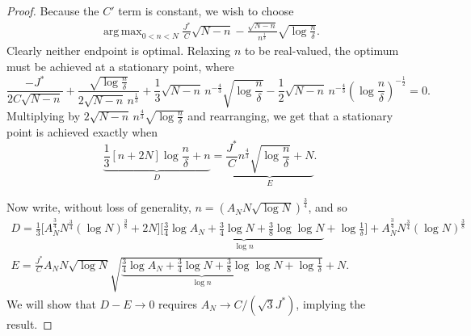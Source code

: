 \documentclass{article}
\DeclareMathOperator*{\argmax}{arg\,max}
\begin{document}
\begin{proof}
    Because the $C'$ term is constant,
    we wish to choose
    \begin{align*}
         \argmax_{0 < n < N} \frac{J^*}{C} \sqrt{N - n} - \frac{\sqrt{N - n}}{n^{\frac13}} \sqrt{\log\frac{n}{\delta}}
    .\end{align*}
    Clearly neither endpoint is optimal.
    Relaxing $n$ to be real-valued,
    the optimum must be achieved at a stationary point, where
    \[
        \frac{-J^*}{2 C \sqrt{N - n}}
        + \frac{\sqrt{\log \frac n \delta}}{2 \sqrt{N - n} \, n^{\frac13}}
        + \frac13 \sqrt{N - n}\, n^{-\frac43} \sqrt{\log \frac n \delta}
        - \frac12 \sqrt{N - n}\, n^{-\frac43} \left(\log \frac n \delta\right)^{-\frac12}
        = 0
    .\]
    Multiplying by $2 \sqrt{N - n} \, n^\frac43 \sqrt{\log \frac n \delta}$ and rearranging,
    we get that a stationary point is achieved exactly when
    \[
        \underbrace{
            \frac13 \left[ n + 2 N \right] \log \frac n \delta
            + n
        }_{D}
        =
        \underbrace{
            \frac{J^*}{C} n^\frac43 \sqrt{\log\frac n \delta}
          + N
        }_{E}
    .\]

    Now write, without loss of generality, $n = \left( A_N N \sqrt{\log N} \right)^{\frac34}$,
    and so
    \begin{gather*}
        D =
            \frac13 \Bigg[
                A_N^\frac34 N^\frac34 (\log N)^\frac38
                + 2 N
            \Bigg]
            \Bigg[
                \underbrace{\frac34 \log A_N + \frac34 \log N + \frac38 \log\log N}_{\log n}
                + \log\frac1{\delta}
            \Bigg]
            + A_N^\frac34 N^\frac34 (\log N)^\frac38
        \\
        E
        = \frac{J^*}{C} A_N N \sqrt{\log N}
          \sqrt{
            \underbrace{\frac34 \log A_N + \frac34 \log N + \frac38 \log\log N}_{\log n}
            + \log\frac1{\delta}}
        + N 
    .\end{gather*}
    We will show that $D - E \to 0$ requires $A_N \to C / (\sqrt{3} J^*)$,
    implying the result.


\end{proof}
\end{document}

